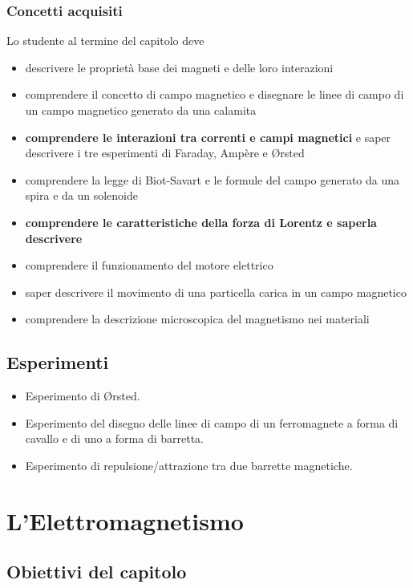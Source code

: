 \documentclass[11pt]{report}
\begin{document}
\subsection*{Concetti acquisiti}
Lo studente al termine del capitolo deve
\begin{itemize}
    \item descrivere le proprietà base dei magneti e delle loro interazioni
    \item comprendere il concetto di campo magnetico e disegnare le linee di campo di un campo magnetico generato da una calamita
    \item \textbf{comprendere le interazioni tra correnti e campi magnetici} e saper descrivere i tre esperimenti di Faraday, Ampère e Ørsted
    \item comprendere la legge di Biot-Savart e le formule del campo generato da una spira e da un solenoide
    \item \textbf{comprendere le caratteristiche della forza di Lorentz e saperla descrivere}
    \item comprendere il funzionamento del motore elettrico
    \item saper descrivere il movimento di una particella carica in un campo magnetico
    \item comprendere la descrizione microscopica del magnetismo nei materiali
\end{itemize}

\section*{Esperimenti}
\begin{itemize}
    \item Esperimento di \O rsted.
    \item Esperimento del disegno delle linee di campo di un ferromagnete a forma di cavallo e di uno a forma di barretta.
    \item Esperimento di repulsione/attrazione tra due barrette magnetiche.
\end{itemize}

\chapter{L'Elettromagnetismo}

\section*{Obiettivi del capitolo}
\end{document}
